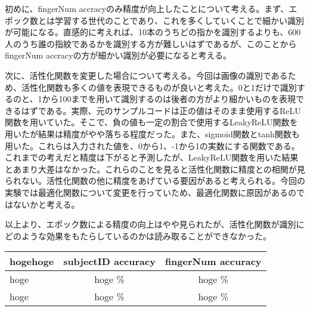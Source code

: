 \documentclass[a4paper, 11pt, titlepage]{jsarticle}
\begin{document}
初めに、fingerNum accracyのみ精度が向上したことについて考える。まず、エポック数とは学習する世代のことであり、これを多くしていくことで細かい識別が可能になる。直感的に考えれば、10本のうちどの指かを識別するよりも、600人のうち誰の指紋であるかを識別する方が難しいはずであるが、このことからfingerNum accracyの方が細かい識別が必要になると考える。

次に、活性化関数を変更した場合について考える。今回は画像の識別であるため、活性化関数も多くの値を表現できるものが良いと考えた。0と1だけで識別するのと、1から100までを用いて識別するのは後者の方がより細かいものを表現できるはずである。実際、元のサンプルコードは正の値はそのまま使用するReLU関数を用いていた。そこで、負の値も一定の割合で使用するLeakyReLU関数を用いたが結果は精度がやや落ちる程度だった。また、sigmoid関数とtanh関数も用いた。これらは入力された値を、0から1、-1から1の実数にする関数である。これまでの考えだと精度は下がると予測したが、LeakyReLU関数を用いた結果とあまり大差はなかった。これらのことを見ると活性化関数に精度との相関が見られない。活性化関数の他に精度をあげている要因があると考えられる。今回の実験では最適化関数について変更を行っていため、最適化関数に原因があるのではないかと考える。

以上より、エポック数による精度の向上はやや見られたが、活性化関数が識別にどのような効果をもたらしているのかは読み取ることができなかった。

\begin{table}[htb]
  \begin{tabular}{|l|c|c|}
    \hline
    hogehoge & subjectID accuracy & fingerNum accuracy  \\ \hline
    hoge & hoge \% & hoge \% \\ \hline
    hoge & hoge \% & hoge \% \\ \hline
  \end{tabular}
\end{table}
\end{document}
